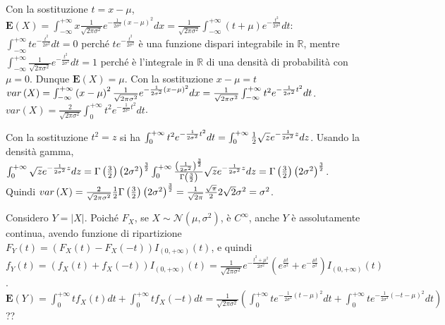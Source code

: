 \documentclass{article}
\begin{document}
\begin{enumerate}
Con la sostituzione $t=x-\mu $, $\mathbf{E}\left( X\right) =\int_{-\infty
}^{+\infty }x\frac{1}{\sqrt{2\pi \sigma ^{2}}}e^{-\frac{1}{2\sigma ^{2}}%
\left( x-\mu \right) ^{2}}dx=\frac{1}{\sqrt{2\pi \sigma ^{2}}}\int_{-\infty
}^{+\infty }\left( t+\mu \right) e^{-\frac{t^{2}}{2\sigma ^{2}}}dt$: $%
\int_{-\infty }^{+\infty }te^{-\frac{t^{2}}{2\sigma ^{2}}}dt=0$ perch\'{e} $%
te^{-\frac{t^{2}}{2\sigma ^{2}}}$ \`{e} una funzione dispari integrabile in $%
\mathbb{R}
$, mentre $\int_{-\infty }^{+\infty }\frac{1}{\sqrt{2\pi \sigma ^{2}}}e^{-%
\frac{t^{2}}{2\sigma ^{2}}}dt=1$ perch\'{e} \`{e} l'integrale in $%
\mathbb{R}
$ di una densit\`{a} di probabilit\`{a} con $\mu =0$. Dunque $\mathbf{E}%
\left( X\right) =\mu $. Con la sostituzione $x-\mu =t$ $var\left( X\right)
=\int_{-\infty }^{+\infty }\left( x-\mu \right) ^{2}\frac{1}{\sqrt{2\pi
\sigma ^{2}}}e^{-\frac{1}{2\sigma ^{2}}\left( x-\mu \right) ^{2}}dx=\frac{1}{%
\sqrt{2\pi \sigma ^{2}}}\int_{-\infty }^{+\infty }t^{2}e^{-\frac{1}{2\sigma
^{2}}t^{2}}dt$. $var\left( X\right) =\frac{2}{\sqrt{2\pi \sigma ^{2}}}%
\int_{0}^{+\infty }t^{2}e^{-\frac{1}{2\sigma ^{2}}t^{2}}dt$.

Con la sostituzione $t^{2}=z$ si ha $\int_{0}^{+\infty }t^{2}e^{-\frac{1}{%
2\sigma ^{2}}t^{2}}dt=\int_{0}^{+\infty }\frac{1}{2}\sqrt{z}e^{-\frac{1}{%
2\sigma ^{2}}z}dz$. Usando la densit\`{a} gamma, $\int_{0}^{+\infty }\sqrt{z}%
e^{-\frac{1}{2\sigma ^{2}}z}dz=\Gamma \left( \frac{3}{2}\right) \left(
2\sigma ^{2}\right) ^{\frac{3}{2}}\int_{0}^{+\infty }\frac{\left( \frac{1}{%
2\sigma ^{2}}\right) ^{\frac{3}{2}}}{\Gamma \left( \frac{3}{2}\right) }\sqrt{%
z}e^{-\frac{1}{2\sigma ^{2}}z}dz=\Gamma \left( \frac{3}{2}\right) \left(
2\sigma ^{2}\right) ^{\frac{3}{2}}$. Quindi $var\left( X\right) =\frac{2}{%
\sqrt{2\pi \sigma ^{2}}}\frac{1}{2}\Gamma \left( \frac{3}{2}\right) \left(
2\sigma ^{2}\right) ^{\frac{3}{2}}=\frac{1}{\sqrt{2\pi }}\frac{\sqrt{\pi }}{2%
}2\sqrt{2}\sigma ^{2}=\sigma ^{2}$.

Considero $Y=\left\vert X\right\vert $. Poich\'{e} $F_{X}$, se $X\sim 
\mathcal{N}\left( \mu ,\sigma ^{2}\right) $, \`{e} $C^{\infty }$, anche $Y$ 
\`{e} assolutamente continua, avendo funzione di ripartizione $F_{Y}\left(
t\right) =\left( F_{X}\left( t\right) -F_{X}\left( -t\right) \right)
I_{\left( 0,+\infty \right) }\left( t\right) $, e quindi $f_{Y}\left(
t\right) =\left( f_{X}\left( t\right) +f_{X}\left( -t\right) \right)
I_{\left( 0,+\infty \right) }\left( t\right) =\frac{1}{\sqrt{2\pi \sigma ^{2}%
}}e^{-\frac{t^{2}+\mu ^{2}}{2\sigma ^{2}}}\left( e^{\frac{\mu t}{\sigma ^{2}}%
}+e^{-\frac{\mu t}{\sigma ^{2}}}\right) I_{\left( 0,+\infty \right) }\left(
t\right) $. $\mathbf{E}\left( Y\right) =\int_{0}^{+\infty }tf_{X}\left(
t\right) dt+\int_{0}^{+\infty }tf_{X}\left( -t\right) dt=\frac{1}{\sqrt{2\pi
\sigma ^{2}}}\left( \int_{0}^{+\infty }te^{-\frac{1}{2\sigma ^{2}}\left(
t-\mu \right) ^{2}}dt+\int_{0}^{+\infty }te^{-\frac{1}{2\sigma ^{2}}\left(
-t-\mu \right) ^{2}}dt\right) $ ??


\end{enumerate}
\end{document}
